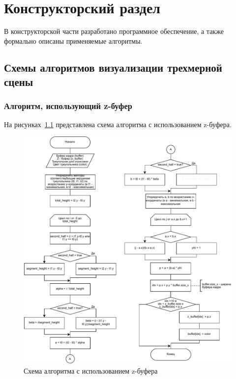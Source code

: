 \chapter{Конструкторский раздел}	
В конструкторской части разработано программное обеспечение, а также формально описаны применяемые алгоритмы.

\section{Схемы алгоритмов визуализации трехмерной сцены}
\subsection{Алгоритм, использующий z-буфер}
На рисунках~\ref{fig:z_buf_2} представлена схема алгоритма с использованием z-буфера.


\begin{figure}[H]
	\centering
	\includegraphics[width=1.0\textwidth, page=1]{assets/img/z-bufer-full.pdf}   
	\caption{Схема алгоритма с использованием z-буфера}
	\label{fig:z_buf_2}
\end{figure}

